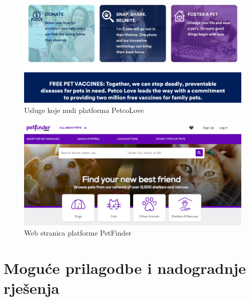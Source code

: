 		\begin{figure}[H]
			\includegraphics[scale = 0.4]{slike/petcoLove.PNG} 
			\centering
			\caption{Usluge koje nudi platforma PetcoLove}
			\label{petcoLove}
		\end{figure}
		
		\begin{figure}[H]
			\includegraphics[scale = 0.5]{slike/petFinder.PNG} 
			\centering
			\caption{Web stranica platforme PetFinder}
			\label{petFinder}
		\end{figure}
		
		\pagebreak
		
		
		\section{Moguće prilagodbe i nadogradnje rješenja}
		
